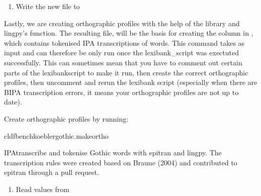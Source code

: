 \documentclass[letterpaper,10pt,english]{sphinxmanual}
\begin{document}
{{{{\begin{fulllineitems}
\begin{enumerate}
\item {} 
\sphinxAtStartPar
Write the new file to 

\end{enumerate}

\end{fulllineitems}


\sphinxAtStartPar
Lastly, we are creating orthographic profiles with the help of the
 library and lingpy’s
function. The resulting file,  will be the basis for
creating the column  in , which contains
tokenised IPA transcriptions of words. This command takes 
as input and can therefore be only run once the lexibank\_script was exectuted
successfully. This can sometimes mean that you have to comment out certain
parts of the lexibank\sphinxhyphen{}script to make it run, then create the correct
orthographic profiles, then uncomment and rerun the lexibank script
(especially when there are BIPA transcription errors, it means your
orthographic profiles are not up to date).

\sphinxAtStartPar
Create orthographic profiles by running:

\begin{sphinxVerbatim}[commandchars=\\\{\}]
cldfbenchkoeblergothic.makeortho
\end{sphinxVerbatim}
\label{\detokenize{mkcldf:module-koeblergothiccommands.makeortho}}
\sphinxAtStartPar
IPA\sphinxhyphen{}transcribe and tokenise Gothic words with epitran and lingpy.
The transcription rules were created based on Braune (2004) and contributed
to epitran through a pull request.

\begin{fulllineitems}
\label{\detokenize{mkcldf:koeblergothiccommands.makeortho.run}}
\pysigstartsignatures
{}
\pysigstopsignatures\begin{enumerate}
%
\item {} 
\sphinxAtStartPar
Read values from 


\end{enumerate}
\end{fulllineitems}}}}}
\end{document}
